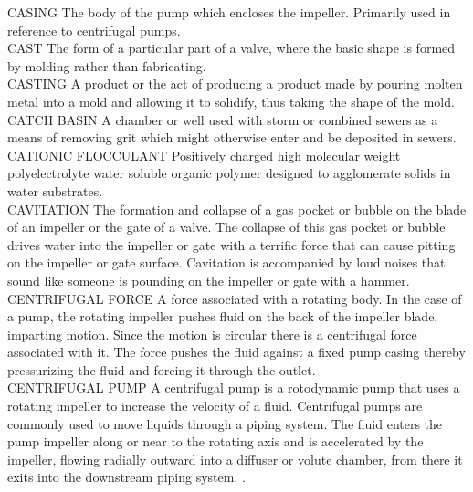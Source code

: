 \documentclass{article}
\begin{document}
CASING
The body of the pump which encloses the impeller. Primarily used in reference to centrifugal pumps.
\vspace{0.3cm}\\
CAST
The form of a particular part of a valve, where the basic shape is formed by molding rather than fabricating.
\vspace{0.3cm}\\
CASTING
A product or the act of producing a product made by pouring molten metal into a mold and allowing it to solidify, thus taking the shape of the mold.
\vspace{0.3cm}\\
CATCH BASIN
A chamber or well used with storm or combined sewers as a means of removing grit which might otherwise enter and be deposited in sewers. 
\vspace{0.3cm}\\
CATIONIC FLOCCULANT
Positively charged high molecular weight polyelectrolyte water soluble organic polymer designed to agglomerate solids in water substrates.
\vspace{0.3cm}\\
CAVITATION
The formation and collapse of a gas pocket or bubble on the blade of an impeller or the gate of a valve. The collapse of this gas pocket or bubble drives water into the impeller or gate with a terrific force that can cause pitting on the impeller or gate surface. Cavitation is accompanied by loud noises that sound like someone is pounding on the impeller or gate with a hammer.
\vspace{0.3cm}\\
CENTRIFUGAL FORCE
A force associated with a rotating body. In the case of a pump, the rotating impeller pushes fluid on the back of the impeller blade, imparting motion. Since the motion is circular there is a centrifugal force associated with it. The force pushes the fluid against a fixed pump casing thereby pressurizing the fluid and forcing it through the outlet.
\vspace{0.3cm}\\
CENTRIFUGAL PUMP
A centrifugal pump is a rotodynamic pump that uses a rotating impeller to increase the velocity of a fluid. Centrifugal pumps are commonly used to move liquids through a piping system. The fluid enters the pump impeller along or near to the rotating axis and is accelerated by the impeller, flowing radially outward into a diffuser or volute chamber, from there it exits into the downstream piping system. .
\vspace{0.3cm}\\
\end{document}
